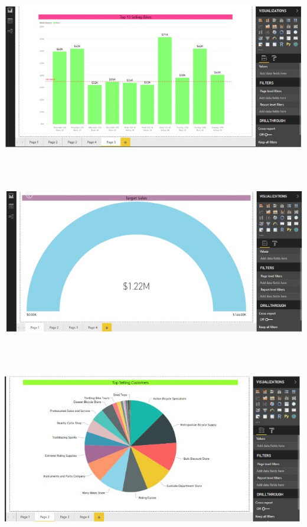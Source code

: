 \documentclass[12pt,letterpaper]{article}
\begin{document}
\begin{flushleft}
\begin{itemize}
\textbf{ }\\
\begin{center}
	\includegraphics[width=15cm]{./Imagenes/image34} 
	\end{center}
\textbf{ }\\
\textbf{ }\\
\begin{center}
	\includegraphics[width=15cm]{./Imagenes/image35} 
	\end{center}
\textbf{ }\\
\textbf{ }\\
\begin{center}
	\includegraphics[width=15cm]{./Imagenes/image36} 
	\end{center}

\end{itemize}
\end{flushleft}
\end{document}
